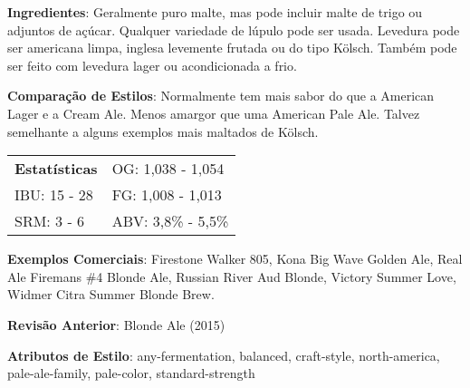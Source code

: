 \textbf{Ingredientes}: Geralmente puro malte, mas pode incluir malte de trigo ou adjuntos de açúcar. Qualquer variedade de lúpulo pode ser usada. Levedura pode ser americana limpa, inglesa levemente frutada ou do tipo Kölsch. Também pode ser feito com levedura lager ou acondicionada a frio.

\textbf{Comparação de Estilos}: Normalmente tem mais sabor do que a American Lager e a Cream Ale. Menos amargor que uma American Pale Ale. Talvez semelhante a alguns exemplos mais maltados de Kölsch.

\begin{tabular}{@{}p{35mm}p{35mm}@{}}
  \textbf{Estatísticas} & OG: 1,038 - 1,054 \\
  IBU: 15 - 28  & FG: 1,008 - 1,013  \\
  SRM: 3 - 6  & ABV: 3,8\% - 5,5\%
\end{tabular}

\textbf{Exemplos Comerciais}: Firestone Walker 805, Kona Big Wave Golden Ale, Real Ale Firemans \#4 Blonde Ale, Russian River Aud Blonde, Victory Summer Love, Widmer Citra Summer Blonde Brew.

\textbf{Revisão Anterior}: Blonde Ale (2015)

\textbf{Atributos de Estilo}: any-fermentation, balanced, craft-style, north-america, pale-ale-family, pale-color, standard-strength
